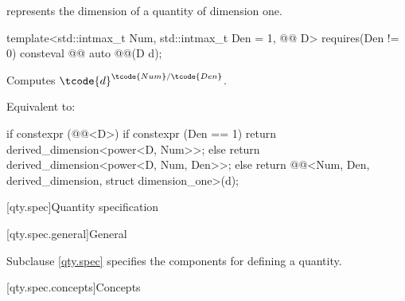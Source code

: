 \pnum
{} represents the dimension of a quantity of dimension one.

\begin{itemdecl}
template<std::intmax_t Num, std::intmax_t Den = 1, @@ D>
  requires(Den != 0)
consteval @@ auto @@(D d);
\end{itemdecl}

\begin{itemdescr}
\pnum
Computes $\tcode{d}^{\tcode{Num}/\tcode{Den}}$.

\pnum
\effects
Equivalent to:
\begin{codeblock}
if constexpr (@@<D>) {
  if constexpr (Den == 1)
    return derived_dimension<power<D, Num>>{};
  else
    return derived_dimension<power<D, Num, Den>>{};
} else
  return @@<Num, Den, derived_dimension, struct dimension_one>(d);
\end{codeblock}
\end{itemdescr}

[qty.spec]{Quantity specification}

[qty.spec.general]{General}

\pnum
Subclause \ref{qty.spec} specifies the components
for defining a quantity.

[qty.spec.concepts]{Concepts}

